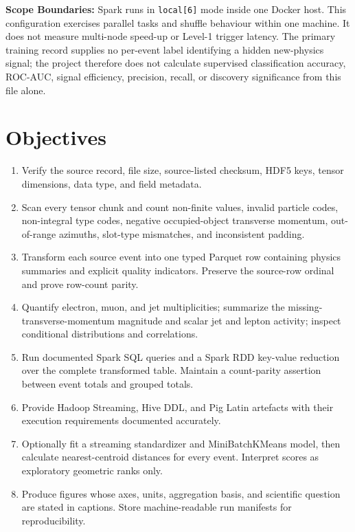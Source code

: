 \documentclass[11pt,a4paper]{article}
\begin{document}
\textbf{Scope Boundaries:} Spark runs in \texttt{local[6]} mode inside one Docker host. This configuration exercises parallel tasks and shuffle behaviour within one machine. It does not measure multi-node speed-up or Level-1 trigger latency. The primary training record supplies no per-event label identifying a hidden new-physics signal; the project therefore does not calculate supervised classification accuracy, ROC-AUC, signal efficiency, precision, recall, or discovery significance from this file alone.

\section{Objectives}

\begin{enumerate}
  \item Verify the source record, file size, source-listed checksum, HDF5 keys, tensor dimensions, data type, and field metadata.
  \item Scan every tensor chunk and count non-finite values, invalid particle codes, non-integral type codes, negative occupied-object transverse momentum, out-of-range azimuths, slot-type mismatches, and inconsistent padding.
  \item Transform each source event into one typed Parquet row containing physics summaries and explicit quality indicators. Preserve the source-row ordinal and prove row-count parity.
  \item Quantify electron, muon, and jet multiplicities; summarize the missing-transverse-momentum magnitude and scalar jet and lepton activity; inspect conditional distributions and correlations.
  \item Run documented Spark SQL queries and a Spark RDD key-value reduction over the complete transformed table. Maintain a count-parity assertion between event totals and grouped totals.
  \item Provide Hadoop Streaming, Hive DDL, and Pig Latin artefacts with their execution requirements documented accurately.
  \item Optionally fit a streaming standardizer and MiniBatchKMeans model, then calculate nearest-centroid distances for every event. Interpret scores as exploratory geometric ranks only.
  \item Produce figures whose axes, units, aggregation basis, and scientific question are stated in captions. Store machine-readable run manifests for reproducibility.
\end{enumerate}
\end{document}

